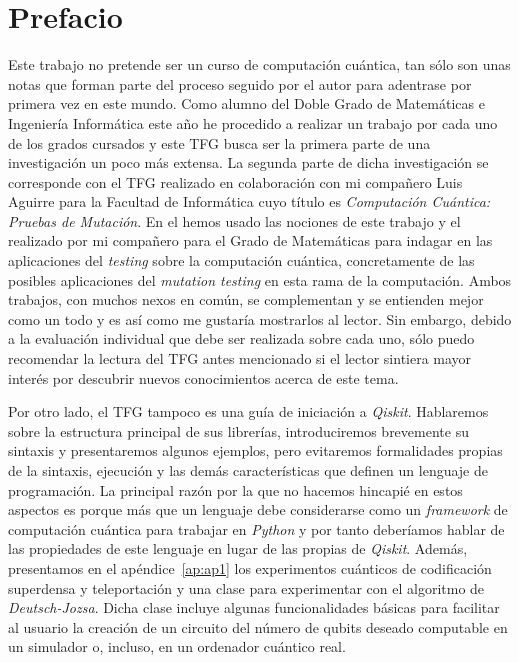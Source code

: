 \chapter*{Prefacio}

Este trabajo no pretende ser un curso de computación cuántica, tan sólo son unas notas que forman parte del proceso seguido por el autor para adentrase por primera vez en este mundo. Como alumno del Doble Grado de Matemáticas e Ingeniería Informática este año he procedido a realizar un trabajo por cada uno de los grados cursados y este TFG busca ser la primera parte de una investigación un poco más extensa. La segunda parte de dicha investigación se corresponde con el TFG realizado en colaboración con mi compañero Luis Aguirre para la Facultad de Informática cuyo título es \textit{Computación Cuántica: Pruebas de Mutación}. En el hemos usado las nociones de este trabajo y el realizado por mi compañero para el Grado de Matemáticas para indagar en las aplicaciones del \textit{testing} sobre la computación cuántica, concretamente de las posibles aplicaciones del \textit{mutation testing} en esta rama de la computación. Ambos trabajos, con muchos nexos en común, se complementan y se entienden mejor como un todo y es así como me gustaría mostrarlos al lector. Sin embargo, debido a la evaluación individual que debe ser realizada sobre cada uno, sólo puedo recomendar la lectura del TFG antes mencionado si el lector sintiera mayor interés por descubrir nuevos conocimientos acerca de este tema.

Por otro lado, el TFG tampoco es una guía de iniciación a \textit{Qiskit}. Hablaremos sobre la estructura principal de sus librerías, introduciremos brevemente su sintaxis  y presentaremos algunos ejemplos, pero evitaremos formalidades propias de la sintaxis, ejecución y las demás características que definen un lenguaje de programación. La principal razón por la que no hacemos hincapié en estos aspectos es porque más que un lenguaje debe considerarse como un \textit{framework} de computación cuántica para trabajar en \textit{Python} y por tanto deberíamos hablar de las propiedades de este lenguaje en lugar de las propias de \textit{Qiskit}. Además, presentamos en el apéndice~\ref{ap:ap1} los experimentos cuánticos de codificación superdensa y teleportación y una clase  para experimentar con el algoritmo de \textit{Deutsch-Jozsa}. Dicha clase incluye algunas funcionalidades básicas para facilitar al usuario la creación de un circuito del número de qubits deseado computable en un simulador o, incluso, en un ordenador cuántico real.

